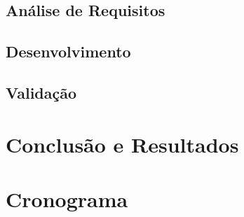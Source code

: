 \documentclass[12pt]{article}
\begin{document}
\subsection{Análise de Requisitos}

\subsection{Desenvolvimento}

\subsection{Validação}


\section{Conclusão e Resultados}\label{sec:figs}

\section{Cronograma}\label{sec:figs}




\end{document}
